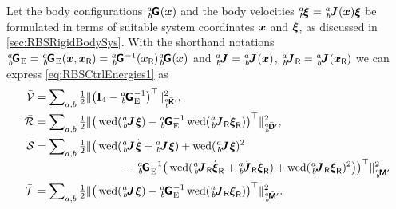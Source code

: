 Let the body configurations $\bodyHomoCoord{\BidxI}{\BidxII}(\sysCoord)$ and the body velocities $\bodyVel{\BidxI}{\BidxII} = \bodyJac{\BidxI}{\BidxII}(\sysCoord) \sysVel$ be formulated in terms of suitable system coordinates $\boldsymbol{x}$ and $\boldsymbol{\xi}$, as discussed in \autoref{sec:RBSRigidBodySys}.
With the shorthand notations $\bodyHomoCoordE{\BidxI}{\BidxII} = \bodyHomoCoordE{\BidxI}{\BidxII}(\sysCoord, \sysCoordR) = \bodyHomoCoord{\BidxI}{\BidxII}^{-1}(\sysCoordR) \bodyHomoCoord{\BidxI}{\BidxII}(\sysCoord)$ and $\bodyJac{\BidxI}{\BidxII} = \bodyJac{\BidxI}{\BidxII}(\sysCoord)$, $\bodyJacR{\BidxI}{\BidxII} = \bodyJac{\BidxI}{\BidxII}(\sysCoordR)$ we can express \eqref{eq:RBSCtrlEnergies1} as
\begin{subequations}
\begin{align}
 \potentialEnergyC &= \sumBodiesAB \tfrac{1}{2} \norm[\bodyStiffMatCp{\BidxI}{\BidxII}]{\big(\idMat[4] - \bodyHomoCoordE{\BidxI}{\BidxII}^{-1}\big)^\top}^2,
\\
 \dissFktC &= \sumBodiesAB \tfrac{1}{2} \norm[\bodyDissMatCp{\BidxI}{\BidxII}]{\big(\wedOp(\bodyJac{\BidxI}{\BidxII} \sysVel) - \bodyHomoCoordE{\BidxI}{\BidxII}^{-1} \wedOp(\bodyJacR{\BidxI}{\BidxII} \sysVelR) \big)^\top}^2,
\\
 \accEnergyC &= \sumBodiesAB \tfrac{1}{2} \norm[\bodyInertiaMatCp{\BidxI}{\BidxII}]{\big(\wedOp(\bodyJac{\BidxI}{\BidxII} \sysVeld + \bodyJacd{\BidxI}{\BidxII} \sysVel) + \wedOp(\bodyJac{\BidxI}{\BidxII} \sysVel)^2 
\nonumber\\[-0.7ex]
 &\hspace{8em}- \bodyHomoCoordE{\BidxI}{\BidxII}^{-1} \big( \wedOp(\bodyJacR{\BidxI}{\BidxII}\sysVelRd + \bodyJacRd{\BidxI}{\BidxII} \sysVelR) + \wedOp(\bodyJacR{\BidxI}{\BidxII} \sysVelR)^2 \big)\big)^\top}^2
\\
 \kineticEnergyC &= \sumBodiesAB \tfrac{1}{2} \norm[\bodyInertiaMatCp{\BidxI}{\BidxII}]{\big(\wedOp(\bodyJac{\BidxI}{\BidxII} \sysVel) - \bodyHomoCoordE{\BidxI}{\BidxII}^{-1} \wedOp(\bodyJacR{\BidxI}{\BidxII} \sysVelR) \big)^\top}^2.
\end{align}
\end{subequations}

